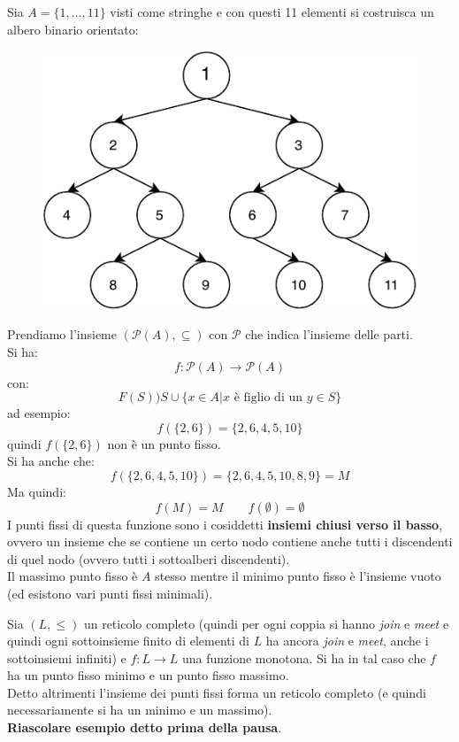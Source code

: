 \begin{esempio}
  Sia $A=\{1,\ldots, 11\}$ visti come stringhe e con questi 11 elementi si
  costruisca un albero binario orientato: 
  \begin{figure}[H]
    \centering
    \includegraphics[scale = 0.9]{img/tree.pdf}
  \end{figure}
  Prendiamo l'insieme
  $(\mathcal{P}(A),\subseteq)$ con $\mathcal{P}$ che indica l'insieme delle
  parti.\\
  Si ha:
  \[f:\mathcal{P}(A)\to \mathcal{P}(A)\]
  con:
  \[F(S))S\cup\{x\in A|x\mbox{ è figlio di un }y\in S\}\]
  ad esempio:
  \[f(\{2, 6\})=\{2, 6, 4, 5, 10\}\]
  quindi $f(\{2, 6\})$ non è un punto fisso.\\
  Si ha anche che:
  \[f(\{2, 6, 4, 5, 10\})=\{2, 6, 4, 5, 10, 8, 9\}=M\]
  Ma quindi:
  \[f(M)=M\qquad f(\emptyset)=\emptyset\]
  I punti fissi di questa funzione sono i cosiddetti \textbf{insiemi chiusi
    verso il basso}, ovvero un insieme che se contiene un certo nodo contiene
  anche tutti i discendenti di quel nodo (ovvero tutti i sottoalberi
  discendenti).\\
  Il massimo punto fisso è $A$ stesso mentre il minimo punto fisso è l'insieme
  vuoto (ed esistono vari punti fissi minimali).
  \label{es:k}
\end{esempio}
\begin{teorema}
  Sia $(L,\leq)$ un reticolo completo (quindi per ogni coppia si hanno
  \textit{join} e \textit{meet} e quindi ogni sottoinsieme finito di elementi di
  $L$ ha ancora \textit{join} e \textit{meet}, anche i sottoinsiemi infiniti) e
  $f:L\to L$ una funzione monotona. Si ha 
  in tal caso che $f$ ha un punto fisso minimo e un punto fisso massimo.\\
  Detto altrimenti l'insieme dei punti fissi forma un reticolo completo (e
  quindi necessariamente si ha un minimo e un massimo).\\
  \textbf{Riascolare esempio detto prima della pausa}.
\end{teorema}
